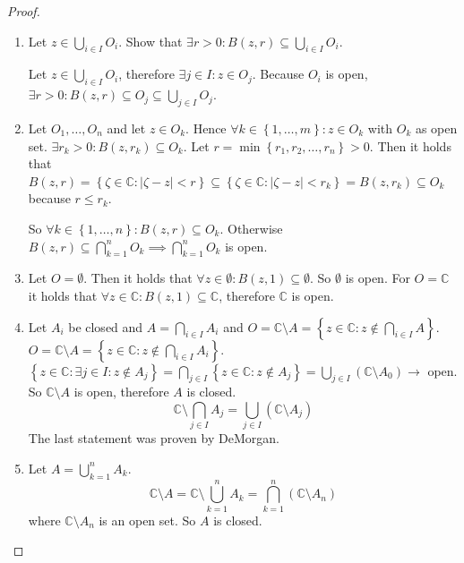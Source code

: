 \documentclass[a4paper,landscape,twocolumn]{article}
\theoremstyle{definition}
\newcommand\set[1]{\left\{#1\right\}}
\newcommand\abs[1]{\left|#1\right|}
\begin{document}
\begin{proof}
  \begin{enumerate}
    \item
      Let $z \in \bigcup_{i \in I} O_i$. Show that $\exists r > 0: B(z, r) \subseteq \bigcup_{i \in I} O_i$.

      Let $z \in \bigcup_{i \in I} O_i$, therefore $\exists j \in I: z \in O_j$.
      Because $O_i$ is open, $\exists r > 0: B(z, r) \subseteq O_j \subseteq \bigcup_{j \in I} O_j$.
    \item
      Let $O_1, \ldots, O_n$ and let $z \in O_k$.
      Hence $\forall k \in \set{1, \dots, m}: z \in O_k$ with $O_k$ as open set.
      $\exists r_k > 0: B(z, r_k) \subseteq O_k$.
      Let $r = \min\set{r_1, r_2, \dots, r_n} > 0$.
      Then it holds that $B(z, r) = \set{\zeta \in \mathbb C: \abs{\zeta - z} < r}
      \subseteq \set{\zeta \in \mathbb C: \abs{\zeta - z} < r_k} = B(z, r_k) \subseteq O_k$ because $r \leq r_k$.

      So $\forall k \in \set{1, \dots, n}: B(z, r) \subseteq O_k$. Otherwise $B(z, r) \subseteq \bigcap_{k=1}^n O_k \implies \bigcap_{k=1}^n O_k$ is open.
    \item
      Let $O = \emptyset$. Then it holds that $\forall z \in \emptyset: B(z, 1) \subseteq \emptyset$.
      So $\emptyset$ is open.
      For $O = \mathbb C$ it holds that $\forall z \in \mathbb C: B(z, 1) \subseteq \mathbb C$,
      therefore $\mathbb C$ is open.
    \item
      Let $A_i$ be closed and $A = \bigcap_{i \in I} A_i$ and $O = \mathbb C \setminus A = \set{z \in \mathbb C: z \not\in \bigcap_{i \in I} A}$. $O = \mathbb C \setminus A = \set{z \in \mathbb C: z \not\in \bigcap_{i \in I} A_i}$.
      $\set{z \in \mathbb C: \exists j \in I: z \not\in A_j} = \bigcap_{j \in I} \set{z \in \mathbb C: z \not\in A_j}
      = \bigcup_{j \in I} \left(\mathbb C \setminus A_0\right) \to$ open.
      So $\mathbb C \setminus A$ is open, therefore $A$ is closed.
      \[ \mathbb C \setminus \bigcap_{j \in I} A_j = \bigcup_{j \in I} (\mathbb C \setminus A_j) \]
      The last statement was proven by DeMorgan.
    \item
      Let $A = \bigcup_{k=1}^n A_k$.
      \[ \mathbb C \setminus A = \mathbb C \setminus \bigcup_{k=1}^n A_k = \bigcap_{k=1}^n (\mathbb C \setminus A_n) \]
      where $\mathbb C \setminus A_n$ is an open set.
      So $A$ is closed.
  \end{enumerate}
\end{proof}
\end{document}
